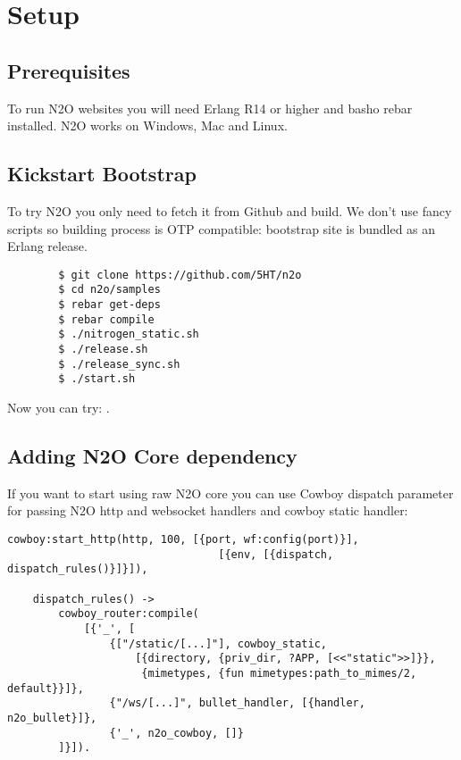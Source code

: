 \section{Setup}

\subsection{Prerequisites}
To run N2O websites you will need Erlang R14 or higher and basho rebar installed.
N2O works on Windows, Mac and Linux.

\subsection{Kickstart Bootstrap}
To try N2O you only need to fetch it from Github and build. We don't use
fancy scripts so building process is OTP compatible: bootstrap site
is bundled as an Erlang release.

\vspace{1\baselineskip}
\begin{lstlisting}
        $ git clone https://github.com/5HT/n2o
        $ cd n2o/samples
        $ rebar get-deps
        $ rebar compile
        $ ./nitrogen_static.sh
        $ ./release.sh
        $ ./release_sync.sh
        $ ./start.sh
\end{lstlisting}
\vspace{1\baselineskip}

Now you can try: .

\newpage
\subsection{Adding N2O Core dependency}
If you want to start using raw N2O core you can use Cowboy dispatch parameter
for passing N2O http and websocket handlers and cowboy static handler:

\begin{lstlisting}[caption=web\_sup.erl]
    cowboy:start_http(http, 100, [{port, wf:config(port)}],
                                 [{env, [{dispatch, dispatch_rules()}]}]),

    dispatch_rules() ->
        cowboy_router:compile(
            [{'_', [
                {["/static/[...]"], cowboy_static,
                    [{directory, {priv_dir, ?APP, [<<"static">>]}},
                     {mimetypes, {fun mimetypes:path_to_mimes/2, default}}]}, 
                {"/ws/[...]", bullet_handler, [{handler, n2o_bullet}]},
                {'_', n2o_cowboy, []}
        ]}]).
\end{lstlisting}

